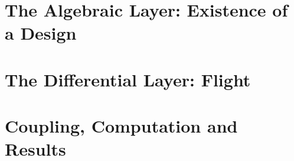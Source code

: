 \documentclass[11pt,twoside]{article}
\begin{document}
\begin{abstract}
Part~III states the co-design problem as a differential-algebraic system with a
fixed-point constraint, gives conditions for the inner map to be well posed and
for the simulation-in-the-loop battery iteration to contract, describes the
engine and its numerical methods, reports verification against the closed
forms and calibration against measured hardware, and presents the resulting
design.

Four findings invert the naive expectation. First, for an indoor
human-adjacent machine the binding constraint is acoustic, not energetic.
Second, a declared sound-power level is not a pressure at one metre, and the
eight-decibel confusion between them, compounded by an uncalibrated anchor,
was worth fourteen decibels of error. Third, the standoff a user specifies is
measured to the display, while the rotors reach most of a metre back toward
them; a safety criterion evaluated at the vehicle centre is wrong by the whole
reach of the machine. Fourth, the standoff that makes the blades safe makes
ordinary text too small: at \SI{1.2}{\metre} a \num{1920}-pixel laptop panel
needs about \rUiScale\,\% interface scaling to meet a \SI{16}{\arcminute}
character height, which leaves a desktop of about
$\rLogicalW\times\rLogicalH$ logical pixels. The resolution is there; the
usable workspace is that of a tablet.
\end{abstract}

\tableofcontents
\clearpage




\part{The Algebraic Layer: Existence of a Design}









\part{The Differential Layer: Flight}



\part{Coupling, Computation and Results}







\appendix





\end{document}
